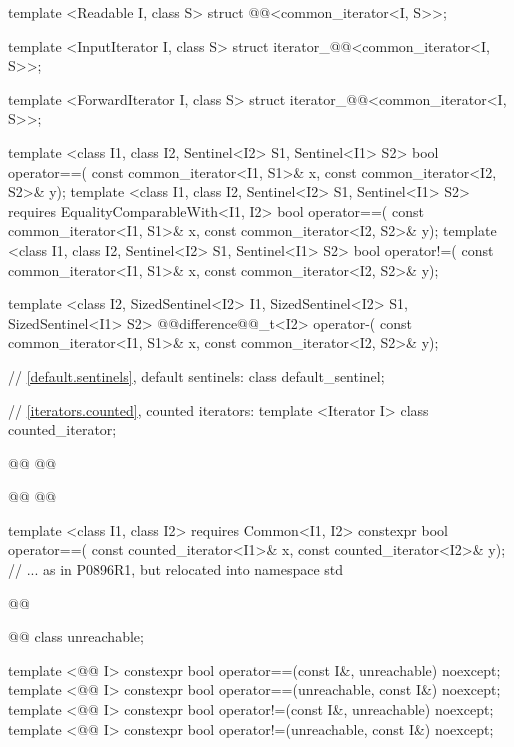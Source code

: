 \begin{codeblock}
{  template <Readable I, class S>
  struct @@<common_iterator<I, S>>;

  template <InputIterator I, class S>
  struct iterator_@@<common_iterator<I, S>>;

  template <ForwardIterator I, class S>
  struct iterator_@@<common_iterator<I, S>>;

  template <class I1, class I2, Sentinel<I2> S1, Sentinel<I1> S2>
  bool operator==(
    const common_iterator<I1, S1>& x, const common_iterator<I2, S2>& y);
  template <class I1, class I2, Sentinel<I2> S1, Sentinel<I1> S2>
    requires EqualityComparableWith<I1, I2>
  bool operator==(
    const common_iterator<I1, S1>& x, const common_iterator<I2, S2>& y);
  template <class I1, class I2, Sentinel<I2> S1, Sentinel<I1> S2>
  bool operator!=(
    const common_iterator<I1, S1>& x, const common_iterator<I2, S2>& y);

  template <class I2, SizedSentinel<I2> I1, SizedSentinel<I2> S1, SizedSentinel<I1> S2>
  @@difference@@_t<I2> operator-(
    const common_iterator<I1, S1>& x, const common_iterator<I2, S2>& y);

  // \ref{default.sentinels}, default sentinels:
  class default_sentinel;

  // \ref{iterators.counted}, counted iterators:
  template <Iterator I> class counted_iterator;

  @@
    @@

  @@
    @@

  template <class I1, class I2>
      requires Common<I1, I2>
    constexpr bool operator==(
      const counted_iterator<I1>& x, const counted_iterator<I2>& y);
  // ... as in P0896R1, but relocated into namespace std

  @@

  @@
  class unreachable;

  template <@@ I>
    constexpr bool operator==(const I&, unreachable) noexcept;
  template <@@ I>
    constexpr bool operator==(unreachable, const I&) noexcept;
  template <@@ I>
    constexpr bool operator!=(const I&, unreachable) noexcept;
  template <@@ I>
    constexpr bool operator!=(unreachable, const I&) noexcept;

}
\end{codeblock}
